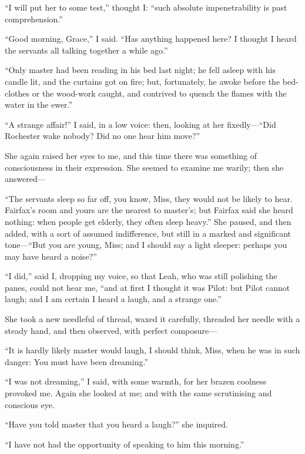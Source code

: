 \enquote{I will put her to some test,} thought I: \enquote{such absolute
impenetrability is past comprehension.}

\enquote{Good morning, Grace,} I said.  \enquote{Has anything happened
here?  I thought I heard the servants all talking together a while ago.}

\enquote{Only master had been reading in his bed last night; he fell
asleep with his candle lit, and the curtains got on fire; but,
fortunately, he awoke before the bed-clothes or the wood-work caught,
and contrived to quench the flames with the water in the ewer.}

\enquote{A strange affair!} I said, in a low voice: then, looking at her
fixedly---\enquote{Did \Mr{} Rochester wake nobody?  Did no one hear him
move?}

She again raised her eyes to me, and this time there was something of
consciousness in their expression.  She seemed to examine me warily;
then she answered---

\enquote{The servants sleep so far off, you know, Miss, they would not
be likely to hear.  \Mrs{} Fairfax's room and yours are the nearest to
master's; but \Mrs{} Fairfax said she heard nothing: when people get
elderly, they often sleep heavy.}  She paused, and then added, with a
sort of assumed indifference, but still in a marked and significant
tone---\enquote{But you are young, Miss; and I should say a light
sleeper: perhaps you may have heard a noise?}

\enquote{I did,} said I, dropping my voice, so that Leah, who was still
polishing the panes, could not hear me, \enquote{and at first I thought
it was Pilot: but Pilot cannot laugh; and I am certain I heard a laugh,
and a strange one.}

She took a new needleful of thread, waxed it carefully, threaded her
needle with a steady hand, and then observed, with perfect composure---

\enquote{It is hardly likely master would laugh, I should think, Miss,
when he was in such danger: You must have been dreaming.}

\enquote{I was not dreaming,} I said, with some warmth, for her brazen
coolness provoked me.  Again she looked at me; and with the same
scrutinising and conscious eye.

\enquote{Have you told master that you heard a laugh?} she inquired.

\enquote{I have not had the opportunity of speaking to him this
morning.}

